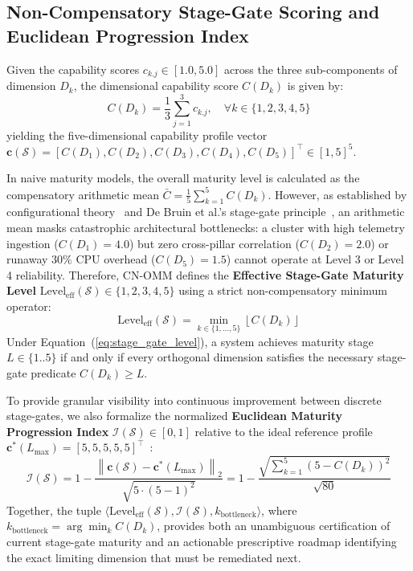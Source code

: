\subsection{Non-Compensatory Stage-Gate Scoring and Euclidean Progression Index}
\label{subsec:scoring_math}

Given the capability scores $c_{k.j} \in [1.0, 5.0]$ across the three sub-components of dimension $D_k$, the dimensional capability score $C(D_k)$ is given by:
\begin{equation}
    C(D_k) = \frac{1}{3} \sum_{j=1}^{3} c_{k.j}, \quad \forall k \in \{1, 2, 3, 4, 5\}
    \label{eq:dimension_score}
\end{equation}
yielding the five-dimensional capability profile vector $\mathbf{c}(\mathcal{S}) = [C(D_1), C(D_2), C(D_3), C(D_4), C(D_5)]^\top \in [1, 5]^5$.

In naive maturity models, the overall maturity level is calculated as the compensatory arithmetic mean $\bar{C} = \frac{1}{5}\sum_{k=1}^5 C(D_k)$. However, as established by configurational theory~\cite{fiss_2011, lasrado_2015} and De Bruin et al.'s stage-gate principle~\cite{debruin_2005}, an arithmetic mean masks catastrophic architectural bottlenecks: a cluster with high telemetry ingestion ($C(D_1) = 4.0$) but zero cross-pillar correlation ($C(D_2) = 2.0$) or runaway $30\%$ CPU overhead ($C(D_5) = 1.5$) cannot operate at Level 3 or Level 4 reliability. Therefore, CN-OMM defines the \textbf{Effective Stage-Gate Maturity Level} $\text{Level}_{\text{eff}}(\mathcal{S}) \in \{1, 2, 3, 4, 5\}$ using a strict non-compensatory minimum operator:
\begin{equation}
    \text{Level}_{\text{eff}}(\mathcal{S}) = \min_{k \in \{1, \dots, 5\}} \left\lfloor C(D_k) \right\rfloor
    \label{eq:stage_gate_level}
\end{equation}
Under Equation~(\ref{eq:stage_gate_level}), a system achieves maturity stage $L \in \{1..5\}$ if and only if every orthogonal dimension satisfies the necessary stage-gate predicate $C(D_k) \ge L$.

To provide granular visibility into continuous improvement between discrete stage-gates, we also formalize the normalized \textbf{Euclidean Maturity Progression Index} $\mathcal{I}(\mathcal{S}) \in [0, 1]$ relative to the ideal reference profile $\mathbf{c}^*(L_{\max}) = [5, 5, 5, 5, 5]^\top$~\cite{lasrado_2015}:
\begin{equation}
    \mathcal{I}(\mathcal{S}) = 1 - \frac{\left\| \mathbf{c}(\mathcal{S}) - \mathbf{c}^*(L_{\max}) \right\|_2}{\sqrt{5 \cdot (5 - 1)^2}} = 1 - \frac{\sqrt{\sum_{k=1}^{5} \left(5 - C(D_k)\right)^2}}{\sqrt{80}}
    \label{eq:euclidean_index}
\end{equation}
Together, the tuple $\langle \text{Level}_{\text{eff}}(\mathcal{S}), \mathcal{I}(\mathcal{S}), k_{\text{bottleneck}} \rangle$, where $k_{\text{bottleneck}} = \arg\min_k C(D_k)$, provides both an unambiguous certification of current stage-gate maturity and an actionable prescriptive roadmap identifying the exact limiting dimension that must be remediated next.
